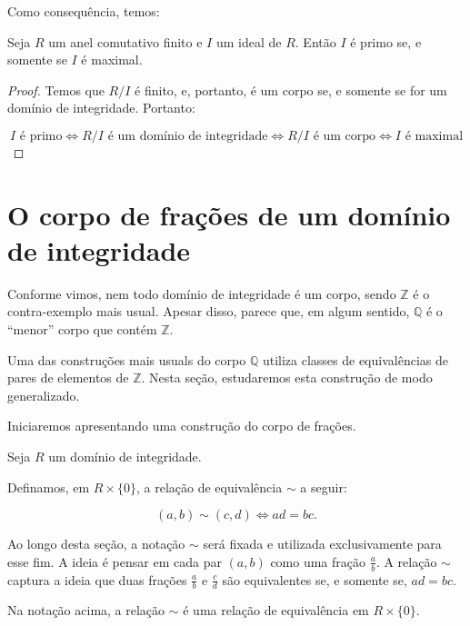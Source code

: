 Como consequência, temos:

\begin{corol}
    Seja $R$ um anel comutativo finito e $I$ um ideal de $R$. Então $I$ é primo se, e somente se $I$ é maximal.
\end{corol}
\begin{proof}
    Temos que $R/I$ é finito, e, portanto, é um corpo se, e somente se for um domínio de integridade.
    Portanto:

    \[I \text{ é primo} \Leftrightarrow R/I \text{ é um domínio de integridade} \Leftrightarrow R/I \text{ é um corpo} \Leftrightarrow I \text{ é maximal}\]
\end{proof}

\section{O corpo de frações de um domínio de integridade}

Conforme vimos, nem todo domínio de integridade é um corpo, sendo $\mathbb Z$ é o contra-exemplo mais usual.
Apesar disso, parece que, em algum sentido, $\mathbb Q$ é o ``menor'' corpo que contém $\mathbb Z$.

Uma das construções mais usuals do corpo $\mathbb Q$ utiliza classes de equivalências de pares de elementos de $\mathbb Z$.
Nesta seção, estudaremos esta construção de modo generalizado.

Iniciaremos apresentando uma construção do corpo de frações.

\begin{definition}
    Seja $R$ um domínio de integridade.

    Definamos, em $R\times \{0\}$, a relação de equivalência $\sim$ a seguir:

    \[(a, b) \sim (c, d) \Leftrightarrow ad=bc.\]
\end{definition}

Ao longo desta seção, a notação $\sim$ será fixada e utilizada exclusivamente para esse fim.
A ideia é pensar em cada par $(a, b)$ como uma fração $\frac{a}{b}$.
A relação $\sim$ captura a ideia que duas frações $\frac{a}{b}$ e $\frac{c}{d}$ são equivalentes se, e somente se, $ad=bc$.

\begin{lemma}
    Na notação acima, a relação $\sim$ é uma relação de equivalência em $R\times \{0\}$.
\end{lemma}

